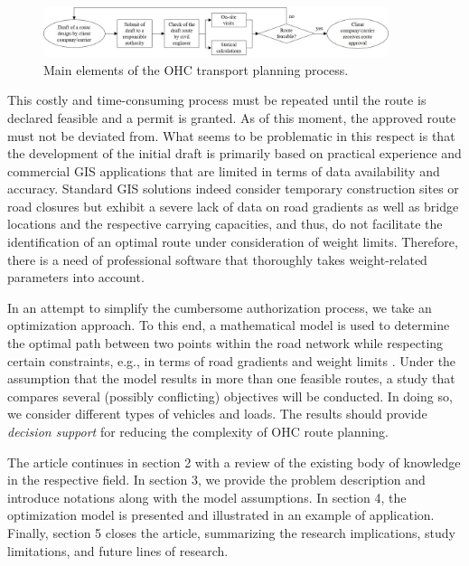 \begin{figure}[!ht]
  \centering
  \includegraphics[width=0.9\textwidth]{final.jpg}
  \caption{Main elements of the OHC transport planning process.}
  \label{fig:higher level}
\end{figure}

This costly and time-consuming process must be repeated until the route is declared feasible and a permit is granted. As of this moment, the approved route must not be deviated from.
What seems to be problematic in this respect is that the development of the initial draft is primarily based on practical experience and commercial GIS applications that are limited in terms of data availability and accuracy.
Standard GIS solutions indeed consider temporary construction sites or road closures but exhibit a severe lack of data on road gradients as well as bridge locations and the respective carrying capacities, and thus, do not facilitate the identification of an optimal route under consideration of weight limits.
Therefore, there is a need of professional software that thoroughly takes weight-related parameters into account.
\par In an attempt to simplify the cumbersome authorization process, we take an optimization approach.
To this end, a mathematical model is used to determine the optimal path between two points within the road network while respecting certain constraints, e.g., in terms of road gradients and weight limits \cite{liedtke2012generation, zhu2014vehicle}.
Under the assumption that the model results in more than one feasible routes, a study that compares several (possibly conflicting) objectives will be conducted.
In doing so, we consider different types of vehicles and loads. The results should provide \textit{decision support} for reducing the complexity of OHC route planning.
\par
The article continues in section 2 with a review of the existing body of knowledge in the respective field.
In section 3, we provide the problem description and introduce notations along with the model assumptions. In section 4, the optimization model is presented and illustrated in an example of application.
Finally, section 5 closes the article, summarizing the research implications, study limitations, and future lines of research.

